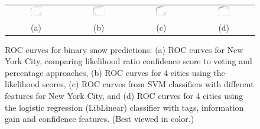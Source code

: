 \begin{figure}
\hspace{-0.25in}
\small{
\begin{tabular}{@{}c@{}c@{}c@{}c@{}}
\includegraphics[width=0.255\textwidth,clip,trim=0.4in 0 0.8in 0]{plots/nyc_snow_ROC.png} &
\includegraphics[width=0.255\textwidth,clip,trim=0.4in 0 0.8in 0]{plots/city_cmp_snow_ROC.png} &
\includegraphics[width=0.255\textwidth,clip,trim=0.4in 0 0.8in 0]{plots/nyc_LibLinear_Tag-Info-conf-TagInfoConf_baseline.png} &
\includegraphics[width=0.255\textwidth,clip,trim=0.4in 0 0.8in 0]{plots/ROC_4cities_Tags_conf_info.png} \\
(a) & (b)  & (c) & (d) 
\end{tabular}
}
\vspace{-6pt}
\caption{ROC curves for binary snow predictions: (a) ROC curves for New York City, comparing likelihood
ratio confidence score to voting and percentage approaches, (b) ROC curves for 4 cities using the likelihood
scores, (c)  ROC curves from SVM classifiers with different features for New York City, and (d) ROC curves for 4 cities using the logistic regression (LibLinear)
classifier with tags, information gain and confidence features. (Best viewed in color.)}
\label{fig:city_roc}
\vspace{-6pt}
\end{figure}

